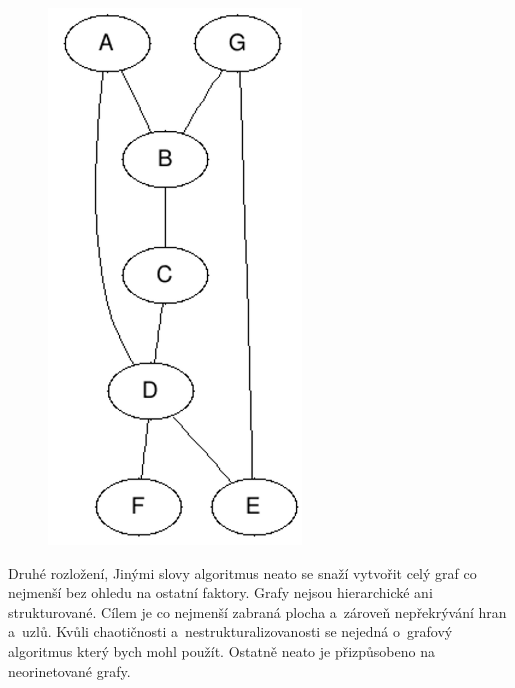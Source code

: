 \documentclass[color,table,oneside,nolot,nolof]{fithesis}
\begin{document}
\begin{figure}
	\centering
	\includegraphics[width=0.6\textwidth]{pictures/dot_example.png} 
\end{figure}
	Druhé rozložení, \cite{graphviz_layout}
	Jinými slovy algoritmus neato se snaží vytvořit celý graf co nejmenší bez ohledu na ostatní faktory. Grafy nejsou hierarchické ani 
	strukturované. Cílem je co nejmenší zabraná plocha a~zároveň nepřekrývání hran a~uzlů. Kvůli chaotičnosti a~nestrukturalizovanosti se nejedná o~grafový algoritmus který bych mohl
	použít. Ostatně neato je přizpůsobeno na neorinetované grafy.
\end{document}
